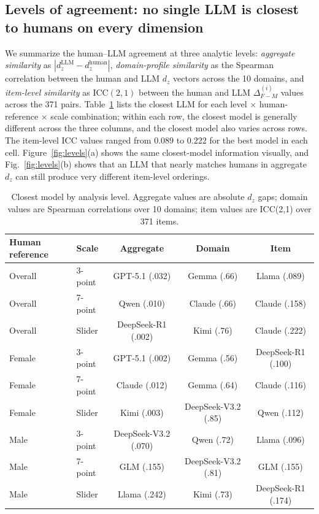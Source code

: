 \documentclass[runningheads]{llncs}
\begin{document}
\subsection{Levels of agreement: no single LLM is closest to humans on every dimension}
\label{sec:r-levels}

We summarize the human--LLM agreement at three analytic levels: \emph{aggregate similarity} as $|d_z^{\text{LLM}}-d_z^{\text{human}}|$, \emph{domain-profile similarity} as the Spearman correlation between the human and LLM $d_z$ vectors across the 10 domains, and \emph{item-level similarity} as $\mathrm{ICC}(2,1)$ between the human and LLM $\Delta_{F-M}^{(i)}$ values across the 371 pairs. Table~\ref{tab:levels} lists the closest LLM for each level $\times$ human-reference $\times$ scale combination; within each row, the closest model is generally different across the three columns, and the closest model also varies across rows. The item-level ICC values ranged from $0.089$ to $0.222$ for the best model in each cell. Figure~\ref{fig:levels}(a) shows the same closest-model information visually, and Fig.~\ref{fig:levels}(b) shows that an LLM that nearly matches humans in aggregate $d_z$ can still produce very different item-level orderings.

\begin{table}[t]
  \centering
  \scriptsize
  \caption{Closest model by analysis level. Aggregate values are absolute $d_z$ gaps; domain values are Spearman correlations over 10 domains; item values are ICC(2,1) over 371 items.}
  \label{tab:levels}
  \begin{tabular}{llccc}
    \toprule
    Human reference & Scale & Aggregate & Domain & Item \\
    \midrule
    Overall & 3-point & GPT-5.1 (.032) & Gemma (.66) & Llama (.089) \\
    Overall & 7-point & Qwen (.010) & Claude (.66) & Claude (.158) \\
    Overall & Slider & DeepSeek-R1 (.002) & Kimi (.76) & Claude (.222) \\
    Female & 3-point & GPT-5.1 (.002) & Gemma (.56) & DeepSeek-R1 (.100) \\
    Female & 7-point & Claude (.012) & Gemma (.64) & Claude (.116) \\
    Female & Slider & Kimi (.003) & DeepSeek-V3.2 (.85) & Qwen (.112) \\
    Male & 3-point & DeepSeek-V3.2 (.070) & Qwen (.72) & Llama (.096) \\
    Male & 7-point & GLM (.155) & DeepSeek-V3.2 (.81) & GLM (.155) \\
    Male & Slider & Llama (.242) & Kimi (.73) & DeepSeek-R1 (.174) \\
    \bottomrule
  \end{tabular}
\end{table}
\end{document}
